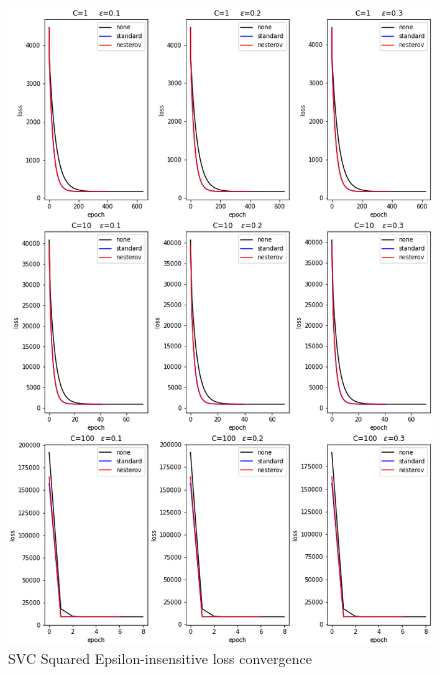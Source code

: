 \begin{figure}[H]
	\centering
	\includegraphics[scale=0.5]{img/svr_squared_eps_loss_history}
	\caption{SVC Squared Epsilon-insensitive loss convergence}
	\label{fig:svr_squared_eps_loss_history}
\end{figure}
